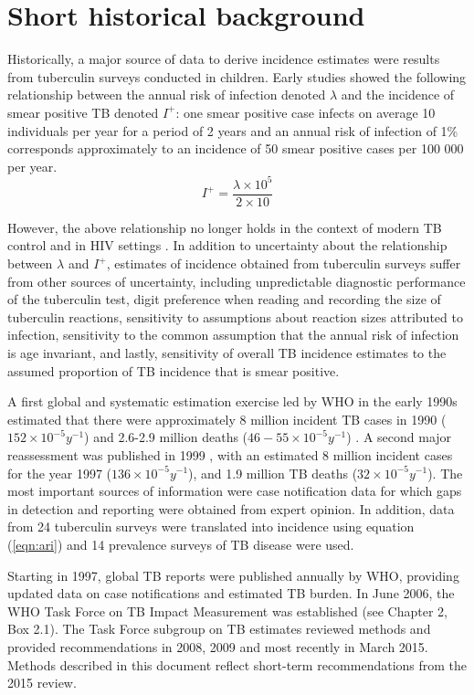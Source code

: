 \section{Short historical background}

Historically, a major source of data to derive incidence estimates were results from tuberculin surveys conducted in children\cite{Styblo1985}. Early studies showed  the following relationship between the annual risk of infection denoted $\lambda$ and the incidence of smear positive TB denoted $I^+$: one smear positive case infects on average 10 individuals per year for a period of 2 years and an annual risk of infection of 1\% corresponds approximately to an incidence of 50 smear positive cases per 100 000 per year.
\begin{equation}
\label{eqn:ari}
I^+ = \frac{\lambda \times 10^5}{2 \times 10}
\end{equation}

However, the above relationship no longer holds in the context of modern TB control and in HIV settings \cite{18235886}. In addition to uncertainty about the relationship between $\lambda$ and $I^+$, estimates of incidence obtained from tuberculin surveys suffer from other sources of uncertainty, including unpredictable diagnostic performance of the tuberculin test, digit preference when reading and recording the size of tuberculin reactions, sensitivity to assumptions about reaction sizes attributed to infection, sensitivity to the common assumption that the annual risk of infection is age invariant, and lastly, sensitivity of overall TB incidence estimates to the assumed proportion of TB incidence that is smear positive. 

A first global and systematic estimation exercise led by WHO in the early 1990s estimated that there were approximately 8 million incident TB cases in 1990 ($152 \times 10^{-5} y^{-1}$) and 2.6-2.9 million deaths ($46-55 \times 10^{-5} y^{-1}$) \cite{1600578}. A second major reassessment was published in 1999 \cite{10517722}, with an estimated 8 million incident  cases for the year 1997 ($136 \times 10^{-5} y^{-1}$), and 1.9 million TB deaths ($32 \times 10^{-5} y^{-1}$). The most important sources of information were case notification data for which gaps in detection and reporting were obtained from expert opinion. In addition, data from 24 tuberculin surveys were translated into incidence using equation (\ref{eqn:ari}) and 14 prevalence surveys of TB disease were used.

Starting in 1997, global TB reports were published annually by WHO, providing updated data on case notifications and estimated TB burden. In June 2006, the WHO Task Force on TB Impact Measurement was established \cite{18201929} (see Chapter 2, Box 2.1). The Task Force subgroup on TB estimates reviewed methods and provided recommendations in 2008, 2009 and most recently in March 2015. Methods described in this document reflect short-term recommendations from the 2015 review. 




  
  
  
  
  
  
  
  
  
  
  